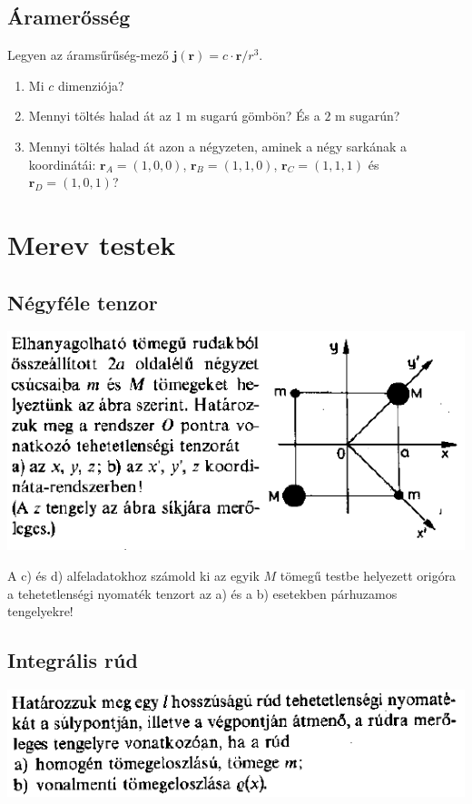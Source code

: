 \documentclass[12pt,a4paper]{scrartcl}
\let\mathbf\bm
\begin{document}
\subsection{Áramerősség}
Legyen az áramsűrűség-mező ${\mathbf{j}}\left( {\mathbf{r}} \right) = c \cdot {\mathbf{r}}/{r^3}$.
\begin{enumerate}
\item Mi $c$ dimenziója?
\item Mennyi töltés halad át az $1\text{ m}$ sugarú gömbön? És a $2\text{ m}$ sugarún?
\item Mennyi töltés halad át azon a négyzeten, aminek a négy sarkának a koordinátái: ${{\mathbf{r}}_A} = \left( {1,0,0} \right)$, ${{\mathbf{r}}_B} = \left( {1,1,0} \right)$, ${{\mathbf{r}}_C} = \left( {1,1,1} \right)$ és ${{\mathbf{r}}_D} = \left( {1,0,1} \right)$?
\end{enumerate}
\fi

\section{Merev testek}
\subsection{Négyféle tenzor}
\includegraphics[scale=0.8]{lusta/merev_test1pelda.png}

A c) és d) alfeladatokhoz számold ki az egyik $M$ tömegű testbe helyezett origóra a tehetetlenségi nyomaték tenzort az a) és a b) esetekben párhuzamos tengelyekre!

\subsection{Integrális rúd}
\includegraphics[scale=0.8]{lusta/merev_test2pelda.png} 
\end{document}
